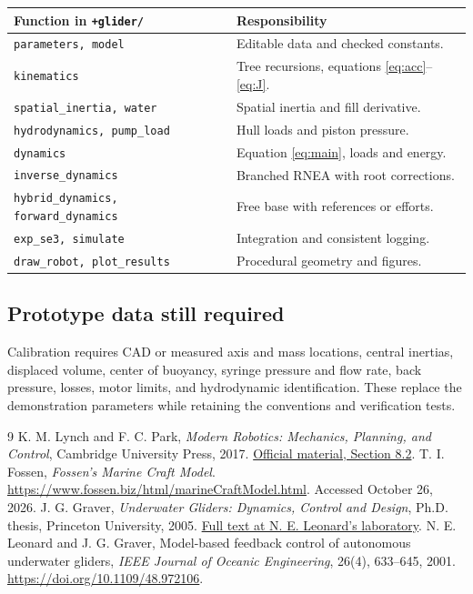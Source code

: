 \documentclass[11pt,a4paper]{article}
\begin{document}
\begin{tabularx}{\textwidth}{@{}lX@{}}\toprule
Function in \texttt{+glider/} & Responsibility\\\midrule
\texttt{parameters, model} & Editable data and checked constants.\\
\texttt{kinematics} & Tree recursions, equations \eqref{eq:acc}--\eqref{eq:J}.\\
\texttt{spatial\_inertia, water} & Spatial inertia and fill derivative.\\
\texttt{hydrodynamics, pump\_load} & Hull loads and piston pressure.\\
\texttt{dynamics} & Equation \eqref{eq:main}, loads and energy.\\
\texttt{inverse\_dynamics} & Branched RNEA with root corrections.\\
\texttt{hybrid\_dynamics, forward\_dynamics} & Free base with references or efforts.\\
\texttt{exp\_se3, simulate} & Integration and consistent logging.\\
\texttt{draw\_robot, plot\_results} & Procedural geometry and figures.\\\bottomrule
\end{tabularx}

\subsection{Prototype data still required}
Calibration requires CAD or measured axis and mass locations, central
inertias, displaced volume, center of buoyancy, syringe pressure and
flow rate, back pressure, losses, motor limits, and hydrodynamic
identification. These replace the demonstration parameters while
retaining the conventions and verification tests.

\begin{thebibliography}{9}
 K. M. Lynch and F. C. Park, \emph{Modern Robotics: Mechanics,
Planning, and Control}, Cambridge University Press, 2017.
\href{https://modernrobotics.northwestern.edu/nu-gm-book-resource/8-2-dynamics-of-a-single-rigid-body-part-2-of-2/}{Official material, Section 8.2}.
 T. I. Fossen, \emph{Fossen's Marine Craft Model}.
\url{https://www.fossen.biz/html/marineCraftModel.html}.
Accessed October 26, 2026.
 J. G. Graver, \emph{Underwater Gliders: Dynamics, Control
and Design}, Ph.D. thesis, Princeton University, 2005.
\href{https://naomi.princeton.edu/wp-content/uploads/sites/744/2021/03/jggraver-thesis-4-11-05.pdf}{Full text at N. E. Leonard's laboratory}.
 N. E. Leonard and J. G. Graver, Model-based feedback control
of autonomous underwater gliders, \emph{IEEE Journal of Oceanic Engineering},
26(4), 633--645, 2001. \url{https://doi.org/10.1109/48.972106}.
\end{thebibliography}
\end{document}
